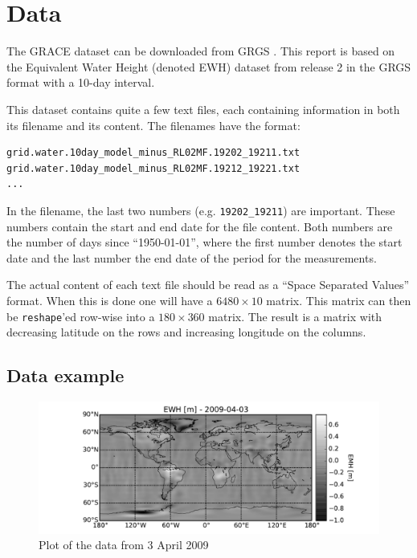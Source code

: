 \section{Data}

The GRACE dataset can be downloaded from GRGS \cite{GRACE-data-source}.
This report is based on the Equivalent Water Height (denoted EWH) dataset from release 2 in the GRGS format with a 10-day interval.

This dataset contains quite a few text files, each containing information in both its filename and its content.
The filenames have the format:

\begin{lstlisting}
grid.water.10day_model_minus_RL02MF.19202_19211.txt
grid.water.10day_model_minus_RL02MF.19212_19221.txt
...
\end{lstlisting}

In the filename, the last two numbers (e.g. \texttt{19202\_19211}) are important.
These numbers contain the start and end date for the file content.
Both numbers are the number of days since ``1950-01-01'', where the first number denotes the start date and the last number the end date of the period for the measurements. \cite{GRACE-data-format-dates}

The actual content of each text file should be read as a ``Space Separated Values'' format.
When this is done one will have a $6480 \times 10$ matrix. 
This matrix can then be \texttt{reshape}'ed row-wise into a $180 \times 360$ matrix.
The result is a matrix with decreasing latitude on the rows and increasing longitude on the columns. \cite{GRACE-data-format-grids}

\subsection{Data example}

\begin{figure}[H]
	\centering
	\includegraphics[width=\textwidth]{figures/data-example-world}
	\caption{Plot of the data from 3 April 2009}
	\label{fig:data-example-world}
\end{figure}

